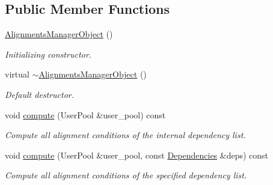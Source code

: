 \subsection*{Public Member Functions}
\begin{DoxyCompactItemize}
\item 
\hyperlink{class_d_d4hep_1_1_alignments_1_1_alignments_manager_object_a8fb4e0202704fdcf8101a42494deca7b}{AlignmentsManagerObject} ()
\begin{DoxyCompactList}\small\item\em Initializing constructor. \item\end{DoxyCompactList}\item 
virtual \hyperlink{class_d_d4hep_1_1_alignments_1_1_alignments_manager_object_a4eb2f5609448d4e70e2cab1b33311f96}{$\sim$AlignmentsManagerObject} ()
\begin{DoxyCompactList}\small\item\em Default destructor. \item\end{DoxyCompactList}\item 
void \hyperlink{class_d_d4hep_1_1_alignments_1_1_alignments_manager_object_af49fc575ee0f8340b2655fd0dab17cbb}{compute} (UserPool \&user\_\-pool) const 
\begin{DoxyCompactList}\small\item\em Compute all alignment conditions of the internal dependency list. \item\end{DoxyCompactList}\item 
void \hyperlink{class_d_d4hep_1_1_alignments_1_1_alignments_manager_object_af1c948318a90348d15de1cf11c1ee5e0}{compute} (UserPool \&user\_\-pool, const \hyperlink{class_d_d4hep_1_1_conditions_1_1_conditions_dependency_collection}{Dependencies} \&deps) const 
\begin{DoxyCompactList}\small\item\em Compute all alignment conditions of the specified dependency list. \item\end{DoxyCompactList}\end{DoxyCompactItemize}
